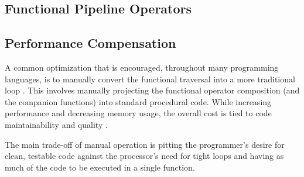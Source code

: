 \subsection{Functional Pipeline Operators}

\subsection{Performance Compensation}
A common optimization that is encouraged, throughout many programming languages, is to manually convert the functional traversal into a more traditional  loop \cite{iterperf09} \cite{iterperf10} \cite{iterperf11}.  This involves manually projecting the functional operator composition (and the companion functions) into standard procedural code.  While increasing performance and decreasing memory usage, the overall cost is tied to code maintainability and quality \cite{langstudy14}.  

The main trade-off of manual operation is pitting the programmer's desire for clean, testable code against the processor's need for tight loops and having as much of the code to be executed in a single function.  